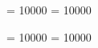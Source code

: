 
\binoppenalty = 10000      %
\relpenalty = 10000        %

\sloppy                    %
\clubpenalty = 10000       %
\widowpenalty = 10000      %

